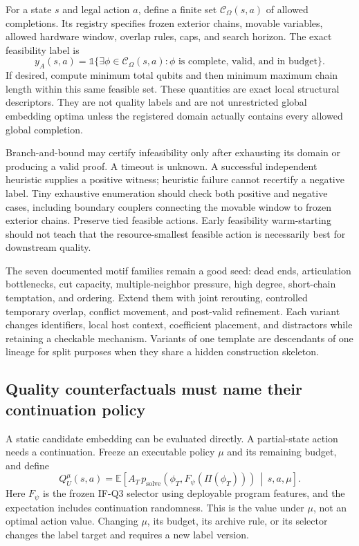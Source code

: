 \documentclass[11pt,a4paper]{article}
\newcommand{\ind}{\mathbb{1}}
\theoremstyle{definition}\newtheorem{definition}[proposition]{Definition}
\begin{document}
For a state $s$ and legal action $a$, define a finite set $\mathcal C_\Omega(s,a)$ of allowed completions. Its registry specifies frozen exterior chains, movable variables, allowed hardware window, overlap rules, caps, and search horizon. The exact feasibility label is
\[
 y_A(s,a)=\ind\{\exists\phi\in\mathcal C_\Omega(s,a):
                    \phi\text{ is complete, valid, and in budget}\}.
\]
If desired, compute minimum total qubits and then minimum maximum chain length within this same feasible set. These quantities are exact local structural descriptors. They are not quality labels and are not unrestricted global embedding optima unless the registered domain actually contains every allowed global completion.

Branch-and-bound may certify infeasibility only after exhausting its domain or producing a valid proof. A timeout is unknown. A successful independent heuristic supplies a positive witness; heuristic failure cannot recertify a negative label. Tiny exhaustive enumeration should check both positive and negative cases, including boundary couplers connecting the movable window to frozen exterior chains. Preserve tied feasible actions. Early feasibility warm-starting should not teach that the resource-smallest feasible action is necessarily best for downstream quality.

The seven documented motif families remain a good seed: dead ends, articulation bottlenecks, cut capacity, multiple-neighbor pressure, high degree, short-chain temptation, and ordering. Extend them with joint rerouting, controlled temporary overlap, conflict movement, and post-valid refinement. Each variant changes identifiers, local host context, coefficient placement, and distractors while retaining a checkable mechanism. Variants of one template are descendants of one lineage for split purposes when they share a hidden construction skeleton.

\subsection{Quality counterfactuals must name their continuation policy}
\label{data:counterfactual}

A static candidate embedding can be evaluated directly. A partial-state action needs a continuation. Freeze an executable policy $\mu$ and its remaining budget, and define
\begin{equation}
 Q_U^\mu(s,a)=\mathbb E\!\left[
      A_T\,p_{\mathrm{solve}}\!\left(
      \phi_T,F_\psi(\Pi(\phi_T))\right)
      \,\middle|\,s,a,\mu\right].
 \label{data:qmu}
\end{equation}
Here $F_\psi$ is the frozen IF-Q3 selector using deployable program features, and the expectation includes continuation randomness. This is the value under $\mu$, not an optimal action value. Changing $\mu$, its budget, its archive rule, or its selector changes the label target and requires a new label version.
\end{document}
